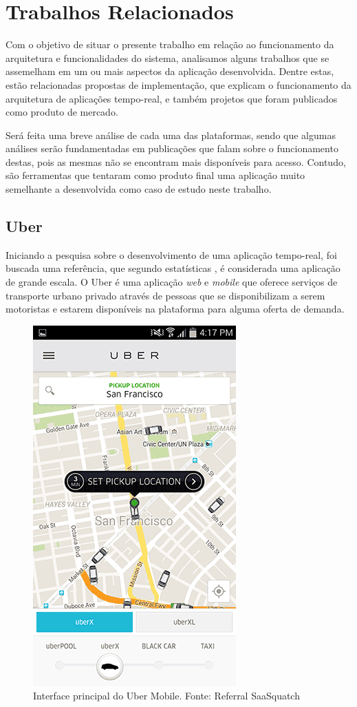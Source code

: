 \chapter{Trabalhos Relacionados}
Com o objetivo de situar o presente trabalho em relação ao funcionamento da arquitetura e funcionalidades do sistema, analisamos alguns trabalhos que se assemelham em um ou mais aspectos da aplicação desenvolvida. Dentre estas, estão relacionadas propostas de implementação, que explicam o funcionamento da arquitetura de aplicações tempo-real, e também projetos que foram publicados como produto de mercado.

Será feita uma breve análise de cada uma das plataformas, sendo que algumas análises serão fundamentadas em publicações que falam sobre o funcionamento destas, pois as mesmas não se encontram mais disponíveis para acesso. Contudo, são ferramentas que tentaram como produto final uma aplicação muito semelhante a desenvolvida como caso de estudo neste trabalho.

\section{Uber}
Iniciando a pesquisa sobre o desenvolvimento de uma aplicação tempo-real, foi buscada uma referência, que segundo estatísticas \cite{uber-statistics}, é considerada uma aplicação de grande escala. O Uber \cite{uber} é uma aplicação \textit{web} e \textit{mobile} que oferece serviços de transporte urbano privado através de pessoas que se disponibilizam a serem motoristas e estarem disponíveis na plataforma para alguma oferta de demanda.

\begin{figure}[!b]
	\centering
	\includegraphics[scale=0.6]{imagens/uber.png}
	\caption{\small Interface principal do Uber Mobile. Fonte: Referral SaaSquatch \cite{uber-imgs}}
	\label{fig:uber-main-interface}
\end{figure}

